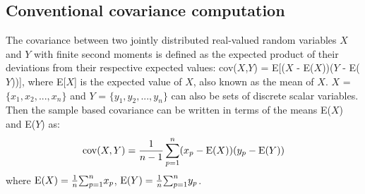 \documentclass[review]{elsarticle}
\begin{document}
\subsection{Conventional covariance computation}
The covariance between two jointly distributed real-valued random variables $X$ and $Y$ with finite second moments is defined as the expected product of their deviations from their respective expected values\cite{dodge2006oxford}: cov($X$,$Y$) = E[($X$ - E($X$))($Y$ - E($Y$))], where E[$X$] is the expected value of $X$, also known as the mean of $X$. $X$ = $\{x_1,x_2,...,x_n\}$ and $Y$ = $\{y_1,y_2,...,y_n\}$ can also be sets of discrete scalar variables.
Then the sample based covariance can be written in terms of the means E($X$) and E($Y$) as:
\begin{equation}
\label{con_CovComputation}
\mathop {\rm cov}(X,Y) = \frac{1}{n-1}\sum_{p=1}^n(x_p-{\rm E}(X))(y_p-{\rm E}(Y))
\end{equation} 
where ${\rm E}(X)=\frac{1}{n}{\sum_{p=1}^n}x_p$, ${\rm E}(Y)=\frac{1}{n}{\sum_{p=1}^n}y_p$.
\end{document}
